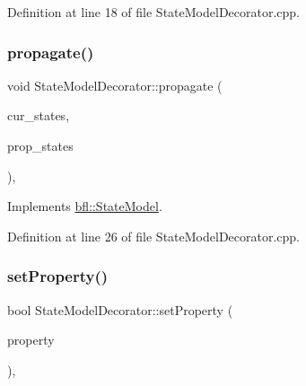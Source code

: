 Definition at line 18 of file State\+Model\+Decorator.\+cpp.

\mbox{\label{classbfl_1_1StateModelDecorator_a9548415d6445c58778eeeadf48ff2672}} 
\subsubsection{\texorpdfstring{propagate()}{propagate()}}
{\footnotesize\ttfamily void State\+Model\+Decorator\+::propagate (\begin{DoxyParamCaption}\item[{const Eigen\+::\+Ref$<$ const Eigen\+::\+Matrix\+Xd $>$ \&}]{cur\+\_\+states,  }\item[{Eigen\+::\+Ref$<$ Eigen\+::\+Matrix\+Xd $>$}]{prop\+\_\+states }\end{DoxyParamCaption})\hspace{0.3cm}{\ttfamily [override]}, {\ttfamily [virtual]}}



Implements \mbox{\hyperlink{classbfl_1_1StateModel_a39cd8c8c5adbd623884583b4a7a7415c}{bfl\+::\+State\+Model}}.



Definition at line 26 of file State\+Model\+Decorator.\+cpp.

\mbox{\label{classbfl_1_1StateModelDecorator_ad292f3b665c1adf20a1f32dc8a065fec}} 
\subsubsection{\texorpdfstring{set\+Property()}{setProperty()}}
{\footnotesize\ttfamily bool State\+Model\+Decorator\+::set\+Property (\begin{DoxyParamCaption}\item[{const std\+::string \&}]{property }\end{DoxyParamCaption})\hspace{0.3cm}{\ttfamily [override]}, {\ttfamily [virtual]}}



